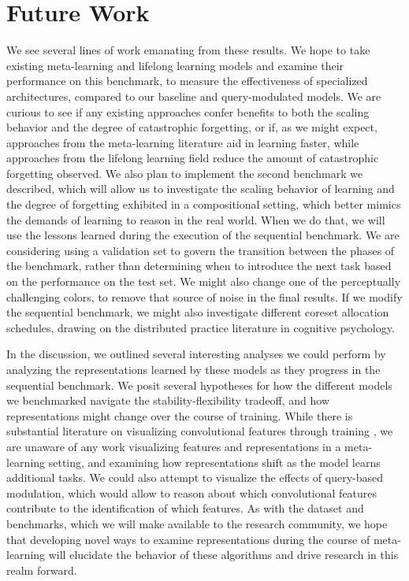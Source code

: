 \section{Future Work}
We see several lines of work emanating from these results. We hope to take existing meta-learning and lifelong learning models and examine their performance on this benchmark, to measure the effectiveness of specialized architectures, compared to our baseline and query-modulated models. We are curious to see if any existing approaches confer benefits to both the scaling behavior and the degree of catastrophic forgetting, or if, as we might expect, approaches from the meta-learning literature aid in learning faster, while approaches from the lifelong learning field reduce the amount of catastrophic forgetting observed. We also plan to implement the second benchmark we described, which will allow us to investigate the scaling behavior of learning and the degree of forgetting exhibited in a compositional setting, which better mimics the demands of learning to reason in the real world. When we do that, we will use the lessons learned during the execution of the sequential benchmark. We are considering using a validation set to govern the transition between the phases of the benchmark, rather than determining when to introduce the next task based on the performance on the test set. We might also change one of the perceptually challenging colors, to remove that source of noise in the final results. If we modify the sequential benchmark, we might also investigate different coreset allocation schedules, drawing on the distributed practice literature in cognitive psychology.  

In the discussion, we outlined several interesting analyses we could perform by analyzing the representations learned by these models as they progress in the sequential benchmark. We posit several hypotheses for how the different models we benchmarked navigate the stability-flexibility tradeoff, and how representations might change over the course of training. While there is substantial literature on visualizing convolutional features through training \parencite{Zeiler2014,Olah2017}, we are unaware of any work visualizing features and representations in a meta-learning setting, and examining how representations shift as the model learns additional tasks. We could also attempt to visualize the effects of query-based modulation, which would allow to reason about which convolutional features contribute to the identification of which features. As with the dataset and benchmarks, which we will make available to the research community, we hope that developing novel ways to examine representations during the course of meta-learning will elucidate the behavior of these algorithms and drive research in this realm forward.

